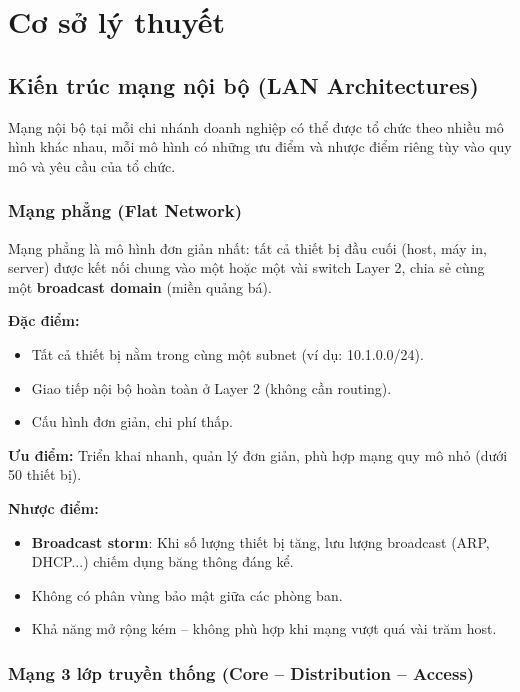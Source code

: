\chapter{Cơ sở lý thuyết}

\section{Kiến trúc mạng nội bộ (LAN Architectures)}

Mạng nội bộ tại mỗi chi nhánh doanh nghiệp có thể được tổ chức theo nhiều mô hình khác nhau, mỗi mô hình có những ưu điểm và nhược điểm riêng tùy vào quy mô và yêu cầu của tổ chức.

\subsection{Mạng phẳng (Flat Network)}

Mạng phẳng là mô hình đơn giản nhất: tất cả thiết bị đầu cuối (host, máy in, server) được kết nối chung vào một hoặc một vài switch Layer 2, chia sẻ cùng một \textbf{broadcast domain} (miền quảng bá).

\textbf{Đặc điểm:}
\begin{itemize}
    \item Tất cả thiết bị nằm trong cùng một subnet (ví dụ: 10.1.0.0/24).
    \item Giao tiếp nội bộ hoàn toàn ở Layer 2 (không cần routing).
    \item Cấu hình đơn giản, chi phí thấp.
\end{itemize}

\textbf{Ưu điểm:} Triển khai nhanh, quản lý đơn giản, phù hợp mạng quy mô nhỏ (dưới 50 thiết bị).

\textbf{Nhược điểm:}
\begin{itemize}
    \item \textbf{Broadcast storm}: Khi số lượng thiết bị tăng, lưu lượng broadcast (ARP, DHCP...) chiếm dụng băng thông đáng kể.
    \item Không có phân vùng bảo mật giữa các phòng ban.
    \item Khả năng mở rộng kém – không phù hợp khi mạng vượt quá vài trăm host.
\end{itemize}

\subsection{Mạng 3 lớp truyền thống (Core -- Distribution -- Access)}

